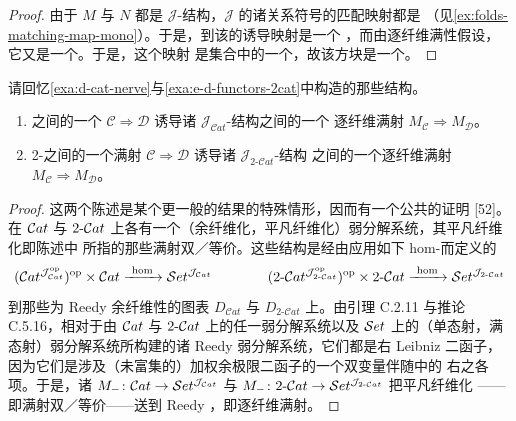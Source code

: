 \begin{proof}
由于 $M$ 与 $N$ 都是 $\mathcal{J}$-结构，$\mathcal{J}$ 的诸关系符号的匹配映射都是%
\trMonomorphism{}（见\cref{ex:folds-matching-map-mono}）。于是，到该\trPullback{}的诱导映射是一个%
\trMonomorphism，而由逐纤维满性假设，它又是一个\trEpimorphism。于是，这个映射
是集合\trCategory{}中的一个\trIsomorphism，故该方块是一个\trPullback。
\end{proof}

请回忆\cref{exa:d-cat-nerve}与\cref{exa:e-d-functors-2cat}中构造的那些结构。

\begin{lemma}\label{lem:surjective-equivalence-fiberwise-surjection}
\begin{enumerate}[label=(\roman*)]
\item \trCategory{}之间的一个\trSurjectiveEquivalence{}
$\mathcal{C}\Rightarrow\mathcal{D}$ 诱导诸 $\mathcal{J}_{\mathcal{C}at}$-结构之间的一个
逐纤维满射 $M_{\mathcal{C}}\Rightarrow M_{\mathcal{D}}$。
\item 2-\trCategory{}之间的一个满射\trBiequivalence{}
$\mathcal{C}\Rightarrow\mathcal{D}$ 诱导诸 $\mathcal{J}_{2\text{-}\mathcal{C}at}$-结构
之间的一个逐纤维满射 $M_{\mathcal{C}}\Rightarrow M_{\mathcal{D}}$。
\end{enumerate}
\end{lemma}

\begin{proof}
这两个陈述是某个更一般的结果的特殊情形，因而有一个公共的证明 [52]。在 $\mathcal{C}at$ 与
$2\text{-}\mathcal{C}at$ 上各有一个（余纤维化，平凡纤维化）弱分解系统，其平凡纤维化即陈述中
所指的那些满射双／等价。这些结构是经由应用如下 hom-\trBifunctor{}而定义的
\begin{equation*}
(\Cat^{\mathcal{J}_{\mathcal{C}at}^{\mathrm{op}}})^{\mathrm{op}}\times\Cat
\xrightarrow{\ \mathrm{hom}\ }\Set^{\mathcal{J}_{\mathcal{C}at}}
\qquad\qquad
(2\text{-}\Cat^{\mathcal{J}_{2\text{-}\mathcal{C}at}^{\mathrm{op}}})^{\mathrm{op}}
\times 2\text{-}\Cat
\xrightarrow{\ \mathrm{hom}\ }\Set^{\mathcal{J}_{2\text{-}\mathcal{C}at}}
\end{equation*}
到那些为 Reedy 余纤维性的图表 $D_{\mathcal{C}at}$ 与 $D_{2\text{-}\mathcal{C}at}$ 上。由引理
C.2.11 与推论 C.5.16，相对于由 $\mathcal{C}at$ 与 $2\text{-}\mathcal{C}at$ 上的任一弱分解系统以及
$\mathcal{S}et$ 上的（单态射，满态射）弱分解系统所构建的诸 Reedy 弱分解系统，它们都是右
Leibniz 二函子，因为它们是涉及（未富集的）加权余极限二函子的一个双变量伴随中的
右\trAdjunction{}之各项。于是，诸\trFunctor{}
$M_{-}\colon\mathcal{C}at\to\mathcal{S}et^{\mathcal{J}_{\mathcal{C}at}}$ 与
$M_{-}\colon 2\text{-}\mathcal{C}at\to\mathcal{S}et^{\mathcal{J}_{2\text{-}\mathcal{C}at}}$ 把平凡纤维化
——即满射双／等价——送到 Reedy \trEpimorphism，即逐纤维满射。
\end{proof}

